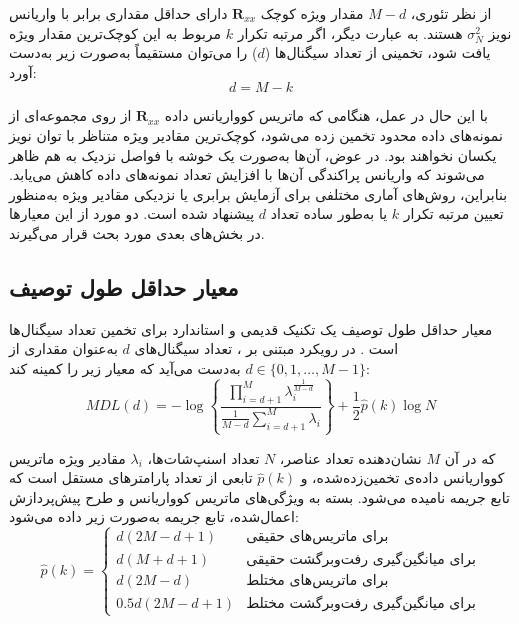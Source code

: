 از نظر تئوری، $M - d$ مقدار ویژه کوچک $\bm{R}_{xx}$ دارای حداقل مقداری برابر با واریانس نویز $\sigma_N^2$ هستند. به عبارت دیگر، اگر مرتبه تکرار $k$ مربوط به این کوچک‌ترین مقدار ویژه یافت شود، تخمینی از تعداد سیگنال‌ها ($d$) را می‌توان مستقیماً به‌صورت زیر به‌دست آورد:
\begin{equation}
	d = M - k
	\label{eq:4-20}
\end{equation}

با این حال در عمل، هنگامی که ماتریس کوواریانس داده $\bm{R}_{xx}$ از روی مجموعه‌ای از نمونه‌های داده محدود تخمین زده می‌شود، کوچک‌ترین مقادیر ویژه متناظر با توان نویز یکسان نخواهند بود. در عوض، آن‌ها به‌صورت یک خوشه با فواصل نزدیک به هم ظاهر می‌شوند که واریانس پراکندگی آن‌ها با افزایش تعداد نمونه‌های داده کاهش می‌یابد. بنابراین، روش‌های آماری مختلفی برای آزمایش برابری یا نزدیکی مقادیر ویژه به‌منظور تعیین مرتبه تکرار $k$ یا به‌طور ساده تعداد $d$ پیشنهاد شده است. دو مورد از این معیارها در بخش‌های بعدی مورد بحث قرار می‌گیرند.

\subsection{معیار حداقل طول توصیف}
\label{subsec:4-3-2}
معیار حداقل طول توصیف یک تکنیک قدیمی و استاندارد برای تخمین تعداد سیگنال‌ها است \cite{4-9}. در رویکرد مبتنی بر ، تعداد سیگنال‌های $d$ به‌عنوان مقداری از $d \in \{0, 1, \dots, M-1\}$ به‌دست می‌آید که معیار زیر را کمینه کند:
\begin{equation}
	MDL(d) = -\log \left\{ \frac{\prod_{i=d+1}^{M} \lambda_i^{\frac{1}{M-d}}}{\frac{1}{M-d} \sum_{i=d+1}^{M} \lambda_i} \right\} + \frac{1}{2} \hat{p}(k) \log N
	\label{eq:4-21}
\end{equation}


که در آن $M$ نشان‌دهنده تعداد عناصر، $N$ تعداد اسنپ‌شات‌ها، $\lambda_i$ مقادیر ویژه ماتریس کوواریانس داده‌ی تخمین‌زده‌شده، و $\hat{p}(k)$ تابعی از تعداد پارامترهای مستقل است که تابع جریمه نامیده می‌شود. بسته به ویژگی‌های ماتریس کوواریانس و طرح پیش‌پردازش اعمال‌شده، تابع جریمه به‌صورت زیر داده می‌شود:
\begin{equation}
	\hat{p}(k) = 
	\begin{cases} 
		d(2M - d + 1) & \text{برای ماتریس‌های حقیقی} \\
		d(M + d + 1) & \text{برای میانگین‌گیری رفت‌وبرگشت حقیقی} \\
		d(2M - d) & \text{برای ماتریس‌های مختلط} \\
		0.5d(2M - d + 1) & \text{برای میانگین‌گیری رفت‌وبرگشت مختلط}
	\end{cases}
	\label{eq:4-22}
\end{equation}

